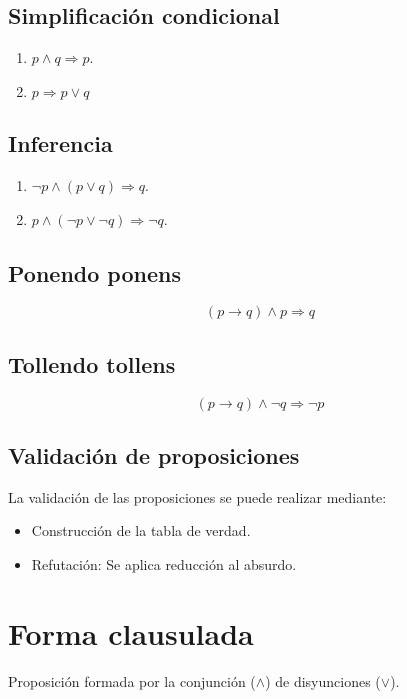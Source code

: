 \subsection{Simplificación condicional}

\begin{enumerate}
 \item $p \wedge q \Rightarrow p$.
 \item $p \Rightarrow p \vee q$
\end{enumerate}

\subsection{Inferencia}

\begin{enumerate}
 \item $\neg p \wedge(p \vee q) \Rightarrow q$.
 \item $p \wedge (\neg p \vee \neg q) \Rightarrow \neg q$.
\end{enumerate}

\subsection{Ponendo ponens}

\[
 (p \rightarrow q) \wedge p \Rightarrow q
\]

\subsection{Tollendo tollens}

\[
 (p \rightarrow q) \wedge \neg q \Rightarrow \neg p
\]


\subsection{Validación de proposiciones}

La validación de las proposiciones se puede realizar mediante:
\begin{itemize}
 \item Construcción de la tabla de verdad.
 \item Refutación: Se aplica reducción al absurdo.
\end{itemize}

\section{Forma clausulada}

Proposición formada por la conjunción ($\wedge$) de disyunciones ($\vee$).